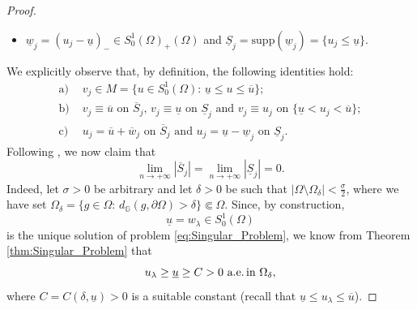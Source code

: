 \documentclass[11pt]{amsart}
\numberwithin{equation}{section} %
\theoremstyle{definition}
\begin{document}
\begin{proof}
\begin{itemize}
		\item[$(\ast)$] $\underline{w}_j = (u_j-\underline{u})_-\in S^{1}_{0}(\Omega)_+(\Omega)$ 
		and $\underline{S}_j = \mathrm{supp}(\underline{w}_j)
		= \{u_j\leq \underline{u}\}$.
	\end{itemize}
	We explicitly observe that, by definition, the following identities hold:
	\begin{equation} \label{eq:indetitiesujvjwj}
		\begin{split}
			\mathrm{a)}&\,\,v_j\in M = \{u\in S^{1}_{0}(\Omega):\,\underline{u}\leq u\leq\overline{u}\}; \\
			\mathrm{b)}&\,\,\text{$v_j \equiv \overline{u}$ on $\overline{S}_j$,
				$v_j \equiv \underline{u}$ on $\underline{S}_j$ and $v_j \equiv u_j$ on 
				$\{\underline{u}<u_j<\overline{u}\}$}; \\
			\mathrm{c)}&\,\,\text{$u_j = \overline{u}+\overline{w}_j$ on $\overline{S}_j$ and
				$u_j = \underline{u}-\underline{w}_j$ on $\underline{S}_j$}.
		\end{split}
	\end{equation}
	Following \cite{Haitao}, we now claim that
	\begin{equation} \label{eq:claimmeasureSn}
		\lim_{n\to+\infty}|\overline{S}_j| = \lim_{n\to+\infty}|\underline{S}_j| = 0.
	\end{equation}
	Indeed, let $\sigma > 0$ be arbitrary and let $\delta > 0$ be such that
	$|\Omega\setminus\Omega_\delta| < \frac{\sigma}{2}$, where we have set
	$\Omega_\delta = \{g\in\Omega:\,d_{\mathbb{G}}(g,\partial\Omega) > \delta\}\Subset\Omega$.
	Since, by construction, 
	$$\underline{u} = w_\lambda\in S^{1}_{0}(\Omega)$$ is the unique solution
	of problem \eqref{eq:Singular_Problem}, 
	we know from Theorem \ref{thm:Singular_Problem} that 
	\begin{equation} \label{eq:underustaccata}
		\text{$u_\lambda\geq \underline{u}\geq C > 0$ a.e.\,in $\Omega_\delta$},
	\end{equation}
	where $C = C(\delta,\underline{u}) > 0$ is a suitable constant 
	(recall that $\underline{u}\leq u_\lambda\leq \overline{u}$).
	\vspace*{0.05cm}
	

\end{proof}
\end{document}
